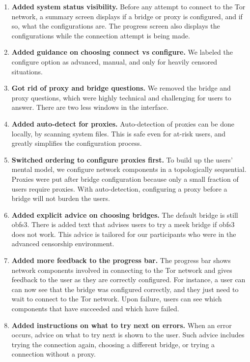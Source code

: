\documentclass[USenglish,oneside,twocolumn]{article}
\begin{document}
\begin{enumerate} \itemsep1pt \parskip0pt  
\item {\bfseries Added system status visibility.} Before any attempt to connect to the Tor network, a summary screen displays if a bridge or proxy is configured, and if so, what the configurations are. The progress screen also displays the configurations while the connection attempt is being made. 
\item {\bfseries Added guidance on choosing connect vs configure.} We labeled the configure option as advanced, manual, and only for heavily censored situations. 
\item {\bfseries Got rid of proxy and bridge questions.}  We removed the bridge and proxy questions, which were highly technical and challenging for users to answer. There are two less windows in the interface.
\item {\bfseries Added auto-detect for proxies.} Auto-detection of proxies can be done locally, by scanning system files. This is safe even for at-risk users, and greatly simplifies the configuration process. 
\item {\bfseries Switched ordering to configure proxies first.} To build up the users' mental model, we configure network components in a topologically sequential. Proxies were put after bridge configuration because only a small fraction of users require proxies. With auto-detection, configuring a proxy before a bridge will not burden the users. 
\item {\bfseries Added explicit advice on choosing bridges.} The default bridge is still obfs3. There is added text that advises users to try a meek bridge if obfs3 does not work. This advice is tailored for our participants who were in the advanced censorship environment. 
\item {\bfseries Added more feedback to the progress bar.} The progress bar shows network components involved in connecting to the Tor network and gives feedback to the user as they are correctly configured. For instance, a user can can now see that the bridge was configured correctly, and they just need to wait to connect to the Tor network. Upon failure, users can see which components that have succeeded and which have failed. 
\item {\bfseries Added instructions on what to try next on errors.} When an error occurs, advice on what to try next is shown to the user. Such advice includes trying the connection again, choosing a different bridge, or trying a connection without a proxy. 

\end{enumerate}
\end{document}
